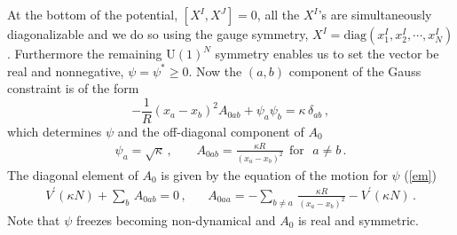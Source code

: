 \documentclass[a4paper,12pt]{article}
\begin{document}
At the bottom of the potential, $[X^{I},X^{J}]=0$, all the $X^{I}$'s are simultaneously diagonalizable and we do
so using the gauge symmetry, $X^{I}=\mbox{diag}(x^{I}_{1},x^{I}_{2},\cdots,x^{I}_{N})$. Furthermore the remaining
$\mbox{U}(1)^{N}$ symmetry enables us to set the vector  be real and nonnegative, $\psi=\psi^{\ast}\geq 0$. Now
the $(a,b)$ component of the Gauss constraint is  of the form
\begin{equation}
-\textstyle{\frac{1}{R}}(x_{a}-x_{b})^{2}A_{0ab}+\psi_{a}\psi_{b}=\kappa\,\delta_{ab}\,,
\end{equation}
which determines $\psi$ and the off-diagonal component of $A_{0}$
\begin{equation}
\begin{array}{cc}
\psi_{a}=\sqrt{\kappa}\,,~~&~~~A_{0ab}=\displaystyle{\frac{\kappa{\scriptstyle
R}}{(x_{a}-x_{b})^{2}}}~~\mbox{for~~}a\neq b\,.
\end{array}
\end{equation}
The diagonal element of $A_{0}$ is given by the equation of the motion for $\psi$ (\ref{em})
\begin{equation}
\begin{array}{cc}
V^{\prime}(\kappa N)+\displaystyle{\sum_{b}}\,A_{0ab}=0\,,~~&~~A_{0aa}=-\displaystyle{\sum_{b\neq
a}}\,\displaystyle{\frac{\kappa{\scriptstyle R}}{(x_{a}-x_{b})^{2}}}-V^{\prime}(\kappa N)\,.
\end{array}
\end{equation}
Note that  $\psi$ freezes becoming non-dynamical   and $A_{0}$ is real and symmetric.\newline
\end{document}
